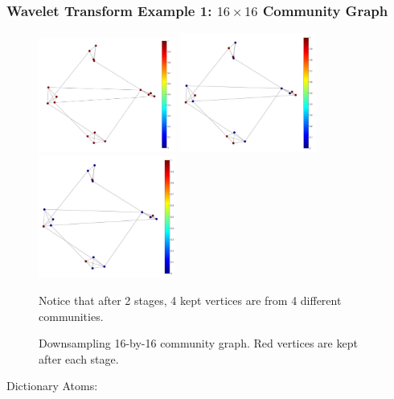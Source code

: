 \documentclass[a4paper]{article}
\begin{document}
\subsubsection{Wavelet Transform Example 1: $16 \times 16$ Community Graph}

\begin{figure}[h]
\centering
\includegraphics[width=4.5cm,keepaspectratio]{graph} \includegraphics[width=4.5cm,keepaspectratio]{downsample_stage_1} \includegraphics[width=4.5cm,keepaspectratio]{downsample_stage_2}

\caption{\label{fig:Community Graph} Downsampling 16-by-16 community graph. Red vertices are kept after each stage.} {Notice that after 2 stages, 4 kept vertices are from 4 different communities.}
\end{figure}

Dictionary Atoms:
\end{document}
